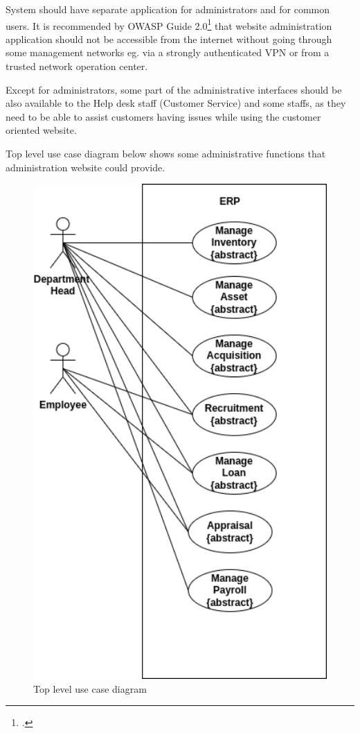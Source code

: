 System should have separate application for administrators and for common users. It is recommended by OWASP Guide 2.0\footcite{https://www.owasp.org} that website administration application should not be accessible from  the internet without going through some management networks eg. via a strongly authenticated VPN or from a trusted network operation center.

Except for administrators, some part of the administrative interfaces should be also available to the Help desk staff (Customer Service) and some staffs, as they need to be able to assist customers having issues while using the customer oriented website.

Top level use case diagram below shows some administrative functions that administration website could provide.

\begin{figure}[!hb]
\includegraphics[width=15cm,keepaspectratio]{usecases/top_level_usecase.drawio.png}
\caption{Top level use case diagram}
\end{figure}
\clearpage

